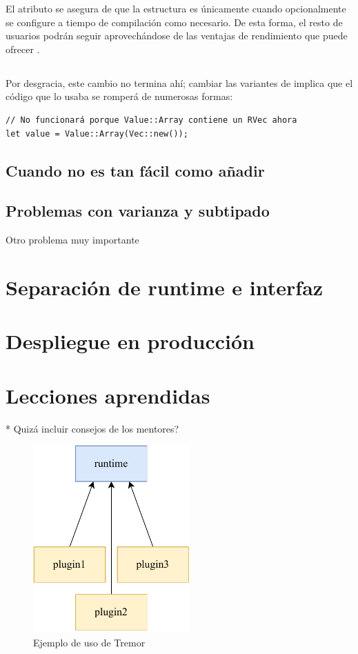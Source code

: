El atributo  se asegura de que la estructura es \code{#[repr(C)]}
únicamente cuando opcionalmente se configure a tiempo de compilación como
necesario. De esta forma, el resto de usuarios podrán seguir aprovechándose de
las ventajas de rendimiento que puede ofrecer .

\subsection{}

Por desgracia, este cambio no termina ahí; cambiar las variantes de 
implica que el código que lo usaba se romperá de numerosas formas:

\begin{verbatim}
// No funcionará porque Value::Array contiene un RVec ahora
let value = Value::Array(Vec::new());
\end{verbatim}

\subsection{Cuando no es tan fácil como añadir }

\subsection{Problemas con varianza y subtipado}

Otro problema muy importante 

\section{Separación de runtime e interfaz}

\section{Despliegue en producción}

\section{Lecciones aprendidas}

* Quizá incluir consejos de los mentores?

\begin{figure}
    \centering
    \includegraphics[width=6cm]{./Imagenes/separation-temporary.pdf}
    \caption{Ejemplo de uso de Tremor}%
    \label{fig:separation_temporary}
\end{figure}

